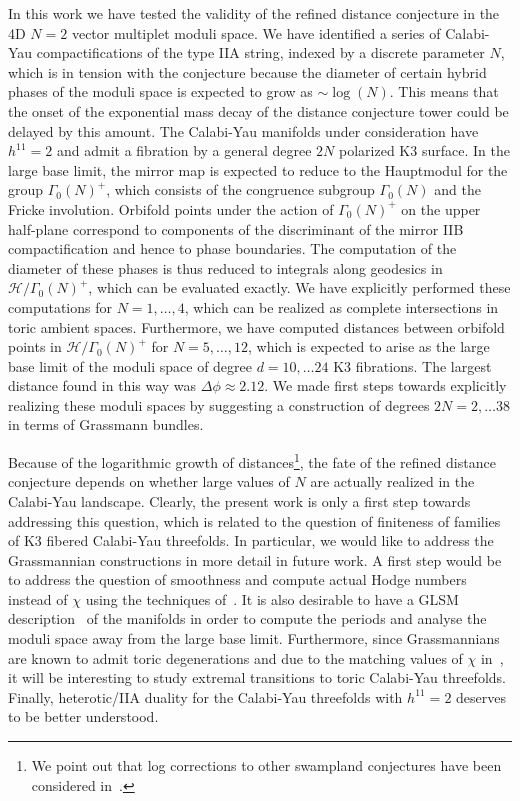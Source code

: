 \documentclass[11pt,a4paper]{article}
\numberwithin{equation}{section}
\numberwithin{table}{section}\setlength{\multlinegap}{25pt}
\begin{document}
In this work we have tested the validity of the refined distance conjecture in the 4D $N=2$ vector multiplet moduli space. We have identified a series of Calabi-Yau compactifications of the type IIA string, indexed by a discrete parameter $N$, which is in tension with the conjecture because the diameter of certain hybrid phases of the moduli space is expected to grow as $\sim\log(N)$. This means that the onset of the exponential mass decay of the distance conjecture tower could be delayed by this amount. The Calabi-Yau manifolds under consideration have $h^{11}=2$ and admit a fibration by a general degree $2N$ polarized K3 surface. In the large base limit, the mirror map is expected to reduce to the Hauptmodul for the group $\Gamma_0(N)^+$, which consists of the congruence subgroup $\Gamma_0(N)$ and the Fricke involution. Orbifold points under the action of $\Gamma_0(N)^+$ on the upper half-plane correspond to components of the discriminant of the mirror IIB compactification and hence to phase boundaries. The computation of the diameter of these phases is thus reduced to integrals along geodesics in $\mathcal{H}/\Gamma_0(N)^+$, which can be evaluated exactly. We have explicitly performed these computations for $N=1,\dots,4$, which can be realized as complete intersections in toric ambient spaces. Furthermore, we have computed distances between orbifold points in $\mathcal{H}/\Gamma_0(N)^+$ for $N=5,\dots,12$, which is expected to arise as the large base limit of the moduli space of degree $d=10,\dots 24$ K3 fibrations. The largest distance found in this way was $\Delta\phi\approx 2.12$. We made first steps towards explicitly realizing these moduli spaces by suggesting a construction of degrees $2N=2,\dots 38$ in terms of Grassmann bundles.

Because of the logarithmic growth of distances\footnote{We point out that log corrections to other swampland conjectures have been considered in~\cite{Blumenhagen:2019vgj}.}, the fate of the refined distance conjecture depends on whether large values of $N$ are actually realized in the Calabi-Yau landscape. Clearly, the present work is only a first step towards addressing this question, which is related to the question of finiteness of families of K3 fibered Calabi-Yau threefolds. In particular, we would like to address the Grassmannian constructions in more detail in future work. A first step would be to address the question of smoothness and compute actual Hodge numbers instead of $\chi$ using the techniques of~\cite{Knapp:2021vkm}. It is also desirable to have a GLSM description~\cite{Hori:2013gga,Caldararu:2017usq,Knapp:2019cih} of the manifolds in order to compute the periods and analyse the moduli space away from the large base limit. Furthermore, since Grassmannians are known to admit toric degenerations and due to the matching values of $\chi$ in~\cite{Batyrev:2008rp}, it will be interesting to study extremal transitions to toric Calabi-Yau threefolds. Finally, heterotic/IIA duality for the Calabi-Yau threefolds with $h^{11}=2$ deserves to be better understood.
\end{document}
